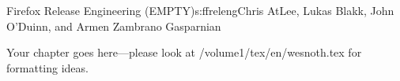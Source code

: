 \begin{aosachapter}{Firefox Release Engineering (EMPTY)}{s:ffreleng}{Chris AtLee, Lukas Blakk, John O'Duinn, and Armen Zambrano Gasparnian}

Your chapter goes here---please look at /volume1/tex/en/wesnoth.tex for 
formatting ideas.

\end{aosachapter}
